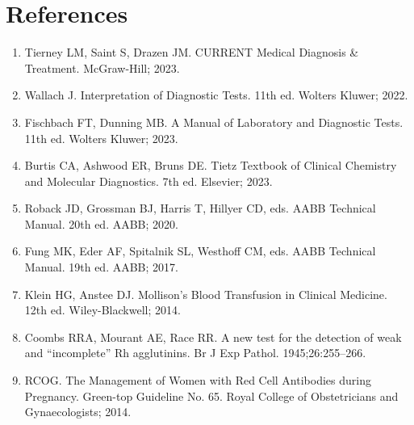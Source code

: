 \section*{References}
\begin{enumerate}
  \item Tierney LM, Saint S, Drazen JM. CURRENT Medical Diagnosis \& Treatment. McGraw-Hill; 2023.
  \item Wallach J. Interpretation of Diagnostic Tests. 11th ed. Wolters Kluwer; 2022.
  \item Fischbach FT, Dunning MB. A Manual of Laboratory and Diagnostic Tests. 11th ed. Wolters Kluwer; 2023.
  \item Burtis CA, Ashwood ER, Bruns DE. Tietz Textbook of Clinical Chemistry and Molecular Diagnostics. 7th ed. Elsevier; 2023.
  \item Roback JD, Grossman BJ, Harris T, Hillyer CD, eds. AABB Technical Manual. 20th ed. AABB; 2020.
  \item Fung MK, Eder AF, Spitalnik SL, Westhoff CM, eds. AABB Technical Manual. 19th ed. AABB; 2017.
  \item Klein HG, Anstee DJ. Mollison's Blood Transfusion in Clinical Medicine. 12th ed. Wiley-Blackwell; 2014.
  \item Coombs RRA, Mourant AE, Race RR. A new test for the detection of weak and ``incomplete'' Rh agglutinins. Br J Exp Pathol. 1945;26:255--266.
  \item RCOG. The Management of Women with Red Cell Antibodies during Pregnancy. Green-top Guideline No. 65. Royal College of Obstetricians and Gynaecologists; 2014.
\end{enumerate}

\clearpage
